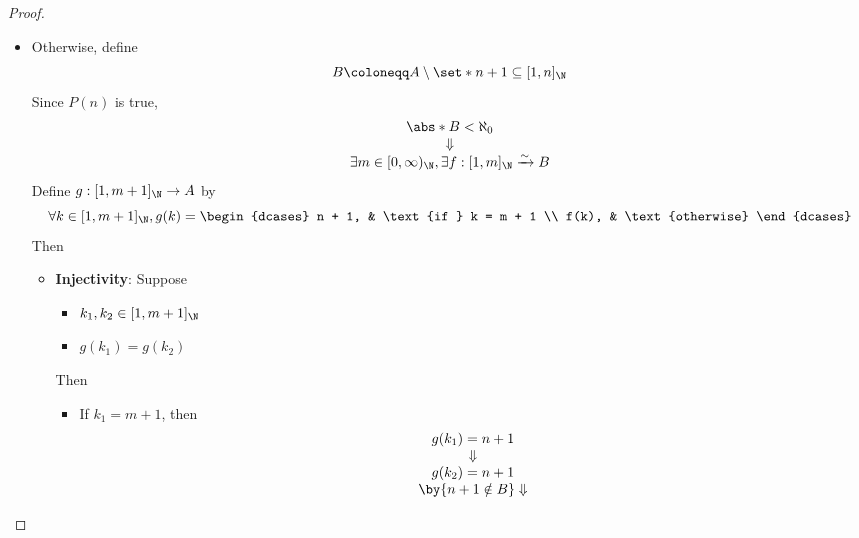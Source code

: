 \begin{proof}
\begin{itemize}
\begin{itemize}
\[\begin{array}{c}
                    \end{array}
                  \]
            \item Otherwise, define
                  \[
                    B \coloneqq A \setminus \set*{n + 1} \subseteq [1, n]_{\N}
                  \]
                  Since $P(n)$ is true,
                  \[
                    \begin{array}{c}
                      \abs*{B} < \aleph_{0} \\
                      \Downarrow            \\
                      \exists m \in [0, \infty)_{\N}, \exists f: [1, m]_{\N} \xrightarrow{\sim} B
                    \end{array}
                  \]
                  Define $g: [1, m + 1]_{\N} \to A$ by
                  \[
                    \forall k \in [1, m + 1]_{\N}, g(k) = \begin{dcases}
                      n + 1, & \text{if } k = m + 1 \\
                      f(k),  & \text{otherwise}
                    \end{dcases}
                  \]
                  Then
                  \begin{itemize}
                    \item \textbf{Injectivity}: Suppose
                          \begin{itemize}
                            \item $k_{1}, k_{2} \in [1, m + 1]_{\N}$
                            \item $g(k_{1}) = g(k_{2})$
                          \end{itemize}
                          Then
                          \begin{itemize}
                            \item If $k_{1} = m + 1$, then
                                  \[
                                    \begin{array}{c}
                                      g(k_{1}) = n + 1                            \\
                                      \Downarrow                                  \\
                                      g(k_{2}) = n + 1                            \\
                                      \by{\ensuremath{n + 1 \notin B}} \Downarrow \\

\end{array}\]
\end{itemize}
\end{itemize}
\end{itemize}
\end{itemize}
\end{proof}
